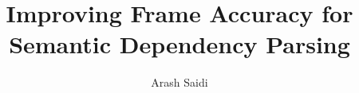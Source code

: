 \documentclass[a4paper,12pt,english, T1]{book}
\title{Improving Frame Accuracy for Semantic Dependency Parsing}
\author{Arash Saidi}
\begin{document}
\newcommand\tab[1][1cm]{\hspace*{#1}}
\duoforside{}




\frontmatter{}
\fancyhead[LE]{\nouppercase\leftmark}
\fancyhead[RO]{\nouppercase\rightmark}
\tableofcontents{}
\listoftables{}
\listoffigures{}

\mainmatter{}








\backmatter


\end{document}
